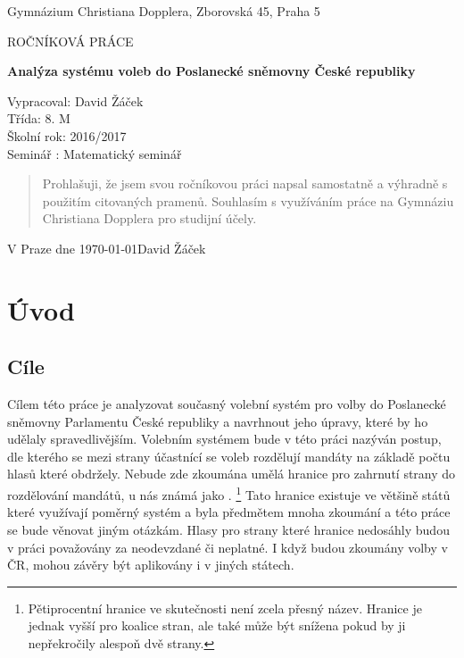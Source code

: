 \documentclass[12pt]{report}
\begin{document}
\begin{titlepage}
	\begin{center}
	{\large Gymnázium Christiana Dopplera, Zborovská 45, Praha 5 \par}
	\vfill
	\par\vspace{1cm}
	{\scshape\LARGE ROČNÍKOVÁ PRÁCE \par}
	{\huge\bfseries Analýza systému voleb do Poslanecké sněmovny České republiky\par}
	\vfill
\end{center}
	\vfill
Vypracoval: David Žáček \\
Třída: 8. M \\
Školní rok: 2016/2017 \\
Seminář : Matematický seminář \\

\end{titlepage}

\vspace*{\fill}
\begin{quote}
Prohlašuji, že jsem svou ročníkovou práci napsal samostatně a výhradně s
použitím 
citovaných pramenů. Souhlasím s
využíváním 
práce na Gymnáziu Christiana Dopplera 
pro studijní účely. \\
\end{quote}

V Praze dne \today \hfill David Žáček

\vspace*{\fill}
\thispagestyle{empty}
\newpage
\tableofcontents
\newpage
\chapter{Úvod}
\section{Cíle} Cílem této práce je analyzovat současný volební systém pro volby do Poslanecké sněmovny Parlamentu České republiky a navrhnout jeho úpravy, které by ho udělaly spravedlivějším.
Volebním systémem bude v této práci nazýván postup, dle kterého se mezi strany účastnící se voleb rozdělují mandáty na základě počtu hlasů které obdržely.
Nebude zde zkoumána umělá hranice pro zahrnutí strany do rozdělování mandátů, u nás známá jako .
\footnote{Pětiprocentní hranice ve skutečnosti není zcela přesný název.
Hranice je jednak vyšší pro koalice stran, ale také může být snížena pokud by ji nepřekročily alespoň dvě strany.\autocite{ZAK}} Tato hranice existuje ve většině států které využívají poměrný systém a byla předmětem mnoha zkoumání a této práce se bude věnovat jiným otázkám.
Hlasy pro strany které hranice nedosáhly budou v práci považovány za neodevzdané či neplatné.
I když budou zkoumány volby v ČR, mohou závěry být aplikovány i v jiných státech.
\end{document}
